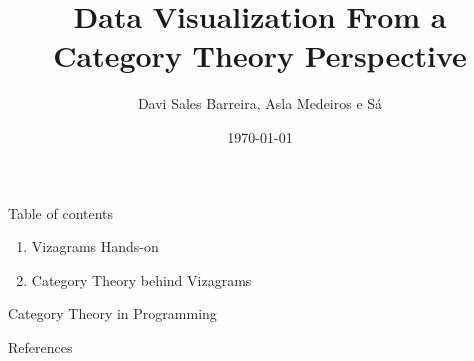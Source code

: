 \documentclass[aspectratio=169,xcolor=dvipsnames,10pt]{beamer}
\title{Data Visualization From a Category Theory Perspective}
\subtitle{}
\author{Davi Sales Barreira, Asla Medeiros e Sá}
\institute
{
    FGV - EMAp, IMPATech
}
\date{\today} %
\theoremstyle{definition}
\begin{document}
\begin{frame}
    \titlepage
\end{frame}

\begin{frame}{Table of contents}
    \begin{enumerate}
        \item Vizagrams Hands-on
        \item Category Theory behind Vizagrams
    \end{enumerate}
\end{frame}

\begin{frame}[fragile]{Category Theory in Programming}
\end{frame}

\begin{frame}{References}
    \footnotesize
    
    
\end{frame}



\end{document}
